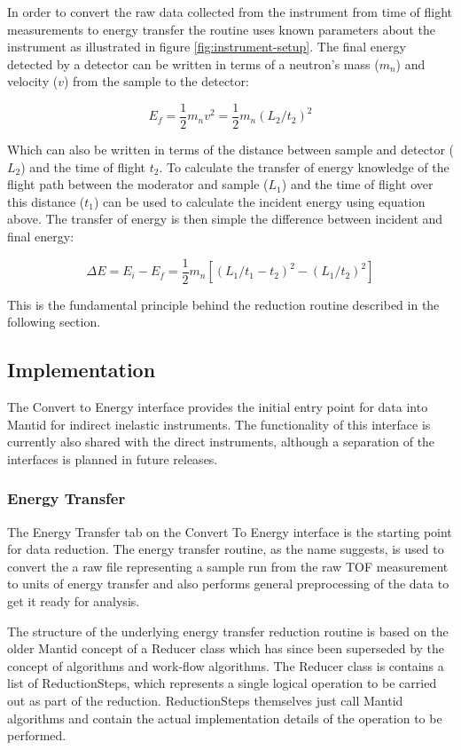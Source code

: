 \documentclass[paper=a4, fontsize=11pt]{scrartcl}	%
\numberwithin{equation}{section}															%
\numberwithin{figure}{section}																%
\numberwithin{table}{section}																%
\begin{document}
In order to convert the raw data collected from the instrument from time of flight measurements to energy transfer the routine uses known parameters about the instrument as illustrated in figure \ref{fig:instrument-setup}. The final energy detected by a detector can be written in terms of a neutron's mass ($m_{n}$) and velocity ($v$) from the sample to the detector:

\begin{equation}
E_f = \frac{1}{2}m_{n}v^2 = \frac{1}{2}m_{n} ( L_2 / t_2 ) ^2
\end{equation}

Which can also be written in terms of the distance between sample and detector ($L_2$) and the time of flight $t_2$. To calculate the transfer of energy knowledge of the flight path between the moderator and sample ($L_1$) and the time of flight over this distance ($t_1$) can be used to calculate the incident energy using equation above. The transfer of energy is then simple the difference between incident and final energy:

\begin{equation}
\Delta E = E_i - E_f = \frac{1}{2}m_n[(L_1 / t_1-t_2)^2 - (L_1/t_2)^2]
\end{equation}

This is the fundamental principle behind the reduction routine described in the following section.

\subsection{Implementation}
The Convert to Energy interface provides the initial entry point for data into Mantid for indirect inelastic instruments. The functionality of this interface is currently also shared with the direct instruments, although a separation of the interfaces is planned in future releases.

\subsubsection{Energy Transfer}
\label{sec:energy-transfer}
The Energy Transfer tab on the Convert To Energy interface is the starting point for data reduction. The energy transfer routine, as the name suggests, is used to convert the a raw file representing a sample run from the raw TOF measurement to units of energy transfer and also performs general preprocessing of the data to get it ready for analysis.

The structure of the underlying energy transfer reduction routine is based on the older Mantid concept of a Reducer class which has since been superseded by the concept of algorithms and work-flow algorithms. The Reducer class is contains a list of ReductionSteps, which represents a single logical operation to be carried out as part of the reduction. ReductionSteps themselves just call Mantid algorithms and contain the actual implementation details of the operation to be performed.
\end{document}
